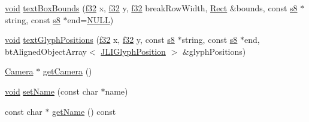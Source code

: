 \begin{DoxyCompactItemize}
\item 
\mbox{\hyperlink{_thread_8h_af1e856da2e658414cb2456cb6f7ebc66}{void}} \mbox{\hyperlink{classnjli_1_1_world_h_u_d_a5d656a3f17364a405cacb8e348d7789a}{text\+Box\+Bounds}} (\mbox{\hyperlink{_util_8h_a5f6906312a689f27d70e9d086649d3fd}{f32}} x, \mbox{\hyperlink{_util_8h_a5f6906312a689f27d70e9d086649d3fd}{f32}} y, \mbox{\hyperlink{_util_8h_a5f6906312a689f27d70e9d086649d3fd}{f32}} break\+Row\+Width, \mbox{\hyperlink{classnjli_1_1_rect}{Rect}} \&bounds, const \mbox{\hyperlink{_util_8h_a2ff401e087cf786c38a6812723e94473}{s8}} $\ast$string, const \mbox{\hyperlink{_util_8h_a2ff401e087cf786c38a6812723e94473}{s8}} $\ast$end=\mbox{\hyperlink{_util_8h_a070d2ce7b6bb7e5c05602aa8c308d0c4}{N\+U\+LL}})
\item 
\mbox{\hyperlink{_thread_8h_af1e856da2e658414cb2456cb6f7ebc66}{void}} \mbox{\hyperlink{classnjli_1_1_world_h_u_d_a4d1a7a9ba1a48de79a88272be7b842ec}{text\+Glyph\+Positions}} (\mbox{\hyperlink{_util_8h_a5f6906312a689f27d70e9d086649d3fd}{f32}} x, \mbox{\hyperlink{_util_8h_a5f6906312a689f27d70e9d086649d3fd}{f32}} y, const \mbox{\hyperlink{_util_8h_a2ff401e087cf786c38a6812723e94473}{s8}} $\ast$string, const \mbox{\hyperlink{_util_8h_a2ff401e087cf786c38a6812723e94473}{s8}} $\ast$end, bt\+Aligned\+Object\+Array$<$ \mbox{\hyperlink{structnjli_1_1_j_l_i_glyph_position}{J\+L\+I\+Glyph\+Position}} $>$ \&glyph\+Positions)
\item 
\mbox{\hyperlink{classnjli_1_1_camera}{Camera}} $\ast$ \mbox{\hyperlink{classnjli_1_1_world_h_u_d_abf86a4d4100ba69abb8426ff0d9fb06b}{get\+Camera}} ()
\item 
\mbox{\hyperlink{_thread_8h_af1e856da2e658414cb2456cb6f7ebc66}{void}} \mbox{\hyperlink{classnjli_1_1_world_h_u_d_a087eb5f8d9f51cc476f12f1d10a3cb95}{set\+Name}} (const char $\ast$name)
\item 
const char $\ast$ \mbox{\hyperlink{classnjli_1_1_world_h_u_d_ad41266885be835f3ee602311e20877a4}{get\+Name}} () const
\end{DoxyCompactItemize}
